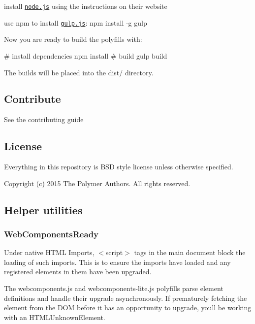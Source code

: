 \begin{DoxyItemize}
\item install \href{http://nodejs.org/}{\tt node.\+js} using the instructions on their website
\item use {\ttfamily npm} to install \href{http://gulpjs.com/}{\tt gulp.\+js}\+: {\ttfamily npm install -\/g gulp}
\end{DoxyItemize}

Now you are ready to build the polyfills with\+: \begin{DoxyVerb}# install dependencies
npm install
# build
gulp build
\end{DoxyVerb}


The builds will be placed into the {\ttfamily dist/} directory.

\subsection*{Contribute}

See the contributing guide

\subsection*{License}

Everything in this repository is B\+SD style license unless otherwise specified.

Copyright (c) 2015 The Polymer Authors. All rights reserved.

\subsection*{Helper utilities}

\subsubsection*{{\ttfamily Web\+Components\+Ready}}

Under native H\+T\+ML Imports, {\ttfamily $<$script$>$} tags in the main document block the loading of such imports. This is to ensure the imports have loaded and any registered elements in them have been upgraded.

The webcomponents.\+js and webcomponents-\/lite.\+js polyfills parse element definitions and handle their upgrade asynchronously. If prematurely fetching the element from the D\+OM before it has an opportunity to upgrade, you\textquotesingle{}ll be working with an {\ttfamily H\+T\+M\+L\+Unknown\+Element}.

